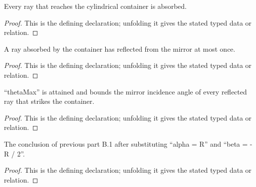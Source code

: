 \begin{definition}[IsFullyAbsorbing]
  \label{decl:physics:IPhO_2026_2_B_2:IsFullyAbsorbing}
  Every ray that reaches the cylindrical container is absorbed.
\end{definition}
\begin{proof}
  This is the defining declaration; unfolding it gives the stated typed data or relation.
\end{proof}

\begin{definition}[IsSingleReflectionRegime]
  \label{decl:physics:IPhO_2026_2_B_2:IsSingleReflectionRegime}
  A ray absorbed by the container has reflected from the mirror at most once.
\end{definition}
\begin{proof}
  This is the defining declaration; unfolding it gives the stated typed data or relation.
\end{proof}

\begin{definition}[IsLargestRelevantIncidenceAngle]
  \label{decl:physics:IPhO_2026_2_B_2:IsLargestRelevantIncidenceAngle}
  “thetaMax” is attained and bounds the mirror incidence angle of every reflected ray that strikes the container.
\end{definition}
\begin{proof}
  This is the defining declaration; unfolding it gives the stated typed data or relation.
\end{proof}

\begin{definition}
  \label{decl:physics:IPhO_2026_2_B_2:HasPartB1RadiusRelation}
  The conclusion of previous part B.1 after substituting “alpha = R” and “beta = -R / 2”.
\end{definition}
\begin{proof}
  This is the defining declaration; unfolding it gives the stated typed data or relation.
\end{proof}

